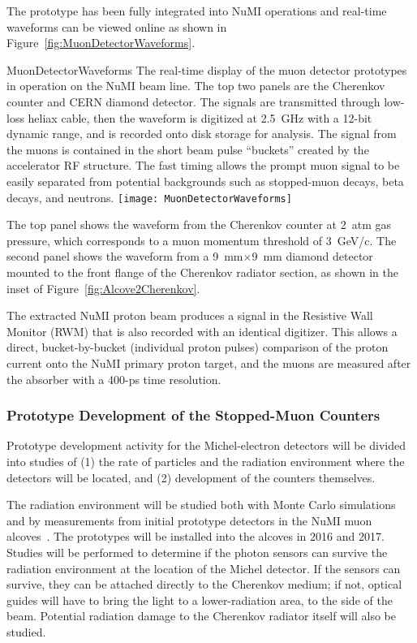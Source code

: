 The prototype has been %
fully integrated into NuMI operations and
real-time waveforms can be viewed online as shown in
Figure~\ref{fig:MuonDetectorWaveforms}.
\begin{cdrfigure}{MuonDetectorWaveforms}
{The real-time display of the muon detector prototypes in operation
on the NuMI beam line. The top two panels are the Cherenkov counter
and CERN diamond detector. The signals are
transmitted through low-loss heliax cable, then the waveform
is digitized at 2.5~GHz with a 12-bit dynamic range, and is
recorded onto disk storage for analysis. The signal from the
muons is contained in the short beam pulse ``buckets'' created
by the accelerator RF structure. The fast timing allows the
prompt muon signal to be easily separated from potential backgrounds
such as stopped-muon decays, beta decays, and neutrons.}
\texttt{[image: MuonDetectorWaveforms]}
\end{cdrfigure}
The top panel shows the waveform from the Cherenkov counter at 2~atm
gas pressure, which corresponds to a muon momentum threshold of
3~GeV/c. The second panel shows the waveform from a 9~mm$\times$9~mm
diamond detector mounted to the front flange of the Cherenkov radiator
section, as shown in the inset of Figure~\ref{fig:Alcove2Cherenkov}.

The extracted NuMI proton beam produces a signal in the  Resistive Wall 
Monitor (RWM) that is also recorded with an identical digitizer.  This allows a direct,
bucket-by-bucket (individual proton pulses) comparison of the proton
current onto the NuMI primary proton target, and the muons are measured
after the absorber with a 400-ps time resolution.

\subsubsection{Prototype Development of the Stopped-Muon Counters}

Prototype development activity for the Michel-electron detectors will
be divided into studies of (1) the rate of particles and the radiation environment where
the detectors will be located, and (2) development of the counters
themselves.

The radiation environment will be studied both with Monte Carlo
simulations and by measurements from initial prototype detectors
in the NuMI muon alcoves~\cite{ref:NuMIBeamMonitors}.
The prototypes will be installed into the alcoves in 2016 and 2017.
Studies will be performed to determine if the photon sensors
can survive the radiation environment at the location of the Michel
detector. If the sensors can survive, they can be attached directly to
the Cherenkov medium; if not, optical guides will have to bring the
light to a lower-radiation area, to the side of the beam. Potential
radiation damage to the Cherenkov radiator itself will also be
studied.

